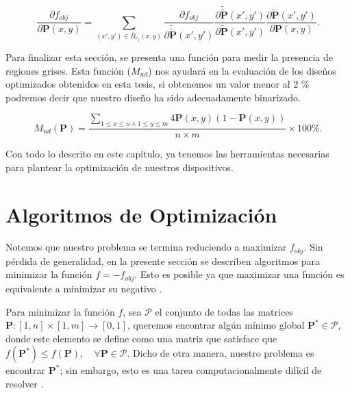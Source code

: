 \begin{equation}
  \frac{\partial f_{obj}}{\partial \boldsymbol{P}(x, y)} = \displaystyle\sum_{(x', y') \in \overline{B}_{r_f}(x, y)}
  \frac{\partial f_{obj}}{\partial \widetilde{\widetilde{\boldsymbol{P}}}(x', y')}
  \frac{\partial \widetilde{\widetilde{\boldsymbol{P}}}(x', y')}{\partial \widetilde{\boldsymbol{P}}(x', y')}
   \frac{\partial \widetilde{\boldsymbol{P}}(x', y')}{\partial \boldsymbol{P}(x, y)}.
  \label{eq:fobjgrad}
\end{equation}

Para finalizar esta sección, se presenta una función para medir la presencia de regiones grises.
Esta función ($M_{nd}$) nos ayudará en la evaluación de los diseños optimizados obtenidos en esta tesis,
si obtenemos un valor menor al 2 \% podremos decir que nuestro diseño ha sido adecuadamente binarizado.

\begin{equation}
  M_{nd} (\boldsymbol{P}) = \frac{\sum_{1 \leq x \leq n \land 1 \leq y \leq m}
  4 \boldsymbol{P}(x, y)(1 - \boldsymbol{P}(x, y))}{n \times m} \times 100 \%.
\label{eq:grayscale}
\end{equation}

Con todo lo descrito en este capítulo, ya tenemos las herramientas necesarias
para plantear la optimización de nuestros dispositivos.

\section{Algoritmos de Optimización}\label{sec:alg-opt}

Notemos que nuestro problema se termina reduciendo a maximizar $f_{obj}$.
Sin pérdida de generalidad, en la presente sección se describen algoritmos
para minimizar la función $f = -f_{obj}$.
Esto es posible ya que maximizar una función es equivalente a minimizar su negativo \citep{Mykel2019}.


Para minimizar la función $f$, sea $\pmb{\mathscr{P}}$ el conjunto de todas las matrices 
$\boldsymbol{P}: [1, n] \times [1, m] \to [0, 1]$, queremos encontrar algún mínimo global 
$\boldsymbol{P^{*}} \in \pmb{\mathscr{P}}$, 
donde este elemento se define como una matriz que satisface que
$f(\boldsymbol{P^{*}}) \leq f(\boldsymbol{P}), \quad \forall \boldsymbol{P} \in \pmb{\mathscr{P}}$. 
Dicho de otra manera, nuestro problema es encontrar $\boldsymbol{P^{*}}$; sin embargo,
esto es una tarea computacionalmente difícil de resolver \citep{Angeris2021}.

